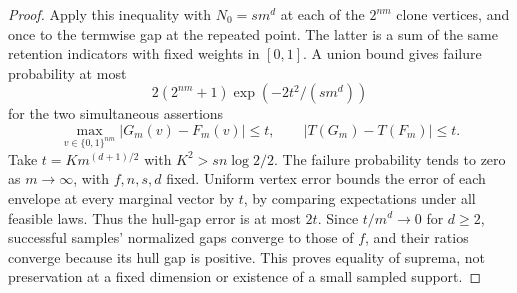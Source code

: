 \begin{proof}
Apply this inequality with $N_0=sm^d$ at each of the $2^{nm}$ clone
vertices, and once to the termwise gap at the repeated point. The latter
is a sum of the same retention indicators with fixed weights in $[0,1]$.
A union bound gives failure probability at most
\begin{equation}\label{eq:clone-union-bound}
 2(2^{nm}+1)\exp(-2t^2/(sm^d))
\end{equation}
for the two simultaneous assertions
\[
 \max_{v\in\{0,1\}^{nm}}|G_m(v)-F_m(v)|\le t,
 \qquad |T(G_m)-T(F_m)|\le t.
\]
Take $t=K m^{(d+1)/2}$ with $K^2>sn\log2/2$. The failure probability
tends to zero as $m\to\infty$, with $f,n,s,d$ fixed. Uniform vertex
error bounds the error of each envelope at every marginal vector by $t$,
by comparing expectations under all feasible laws. Thus the hull-gap
error is at most $2t$. Since $t/m^d\to0$ for $d\ge2$, successful samples'
normalized gaps converge to those of $f$, and their ratios converge
because its hull gap is positive. This proves equality of suprema, not
preservation at a fixed dimension or existence of a small sampled support.
\end{proof}
